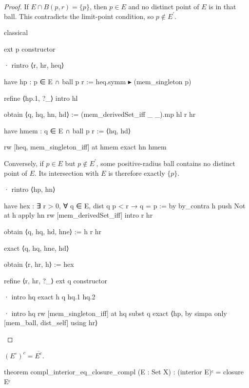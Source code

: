 \begin{proof}
  If $E\cap B(p,r)=\{p\}$, then $p\in E$ and no distinct point of $E$ is in that ball.
  This contradicts the limit-point condition, so $p\notin E^{\prime}$.

  \begin{lean}
    classical

    ext p
    constructor

    · rintro ⟨r, hr, heq⟩

      have hp : p ∈ E ∩ ball p r := heq.symm ▸ (mem_singleton p)

      refine ⟨hp.1, ?_⟩
      intro hl

      obtain ⟨q, hq, hn, hd⟩ := (mem_derivedSet_iff _ _).mp hl r hr

      have hmem : q ∈ E ∩ ball p r := ⟨hq, hd⟩

      rw [heq, mem_singleton_iff] at hmem
      exact hn hmem
  \end{lean}

  Conversely, if $p\in E$ but $p\notin E^{\prime}$, some positive-radius ball contains no distinct
  point of $E$.
  Its intersection with $E$ is therefore exactly $\{p\}$.

  \begin{lean}
    · rintro ⟨hp, hn⟩

      have hex : ∃ r > 0, ∀ q ∈ E, dist q p < r → q = p := by
        by_contra h
        push Not at h
        apply hn
        rw [mem_derivedSet_iff]
        intro r hr

        obtain ⟨q, hq, hd, hne⟩ := h r hr

        exact ⟨q, hq, hne, hd⟩

      obtain ⟨r, hr, h⟩ := hex

      refine ⟨r, hr, ?_⟩
      ext q
      constructor

      · intro hq
        exact h q hq.1 hq.2

      · intro hq
        rw [mem_singleton_iff] at hq
        subst q
        exact ⟨hp, by simpa only [mem_ball, dist_self] using hr⟩
  \end{lean}

\end{proof}

\begin{lemma}
  \label{ma:lem:complement-of-interior-is-closure-of-complement}
  $(E^{\circ})^{c}=\overline{E^{c}}$.

  \begin{lean}
    theorem compl_interior_eq_closure_compl (E : Set X) :
        (interior E)ᶜ = closure Eᶜ
  \end{lean}
\end{lemma}

